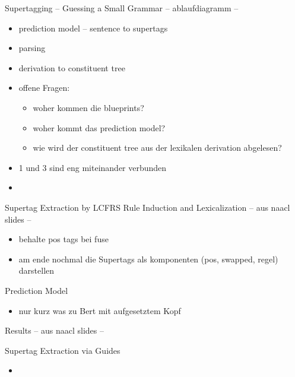 \documentclass[aspectratio=169]{beamer}
\begin{document}
    \begin{frame}{Supertagging -- Guessing a Small Grammar}
        -- ablaufdiagramm --
        \begin{itemize}
            \item prediction model -- sentence to supertags
            \item parsing
            \item derivation to constituent tree
            \item offene Fragen:
            \begin{itemize}
                \item woher kommen die blueprints?
                \item woher kommt das prediction model?
                \item wie wird der constituent tree aus der lexikalen derivation abgelesen?
            \end{itemize}
            \item 1 und 3 sind eng miteinander verbunden
            \item
        \end{itemize}
    \end{frame}

    \begin{frame}{Supertag Extraction by LCFRS Rule Induction and Lexicalization}
        -- aus naacl slides --
        \begin{itemize}
            \item behalte pos tags bei fuse
            \item am ende nochmal die Supertags als komponenten (pos, swapped, regel) darstellen
        \end{itemize}
    \end{frame}

    \begin{frame}{Prediction Model}
        \begin{itemize}
            \item nur kurz was zu Bert mit aufgesetztem Kopf
        \end{itemize}
    \end{frame}

    \begin{frame}{Results}
        -- aus naacl slides --
    \end{frame}

    \begin{frame}{Supertag Extraction via Guides}
        \begin{itemize}
            \item
        \end{itemize}
    \end{frame}
\end{document}
